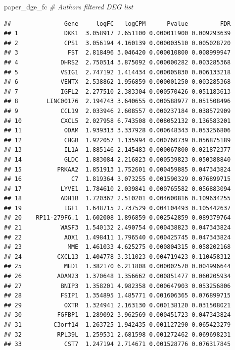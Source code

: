 \documentclass[
]{article}
\newenvironment{Shaded}{\begin{snugshade}}{\end{snugshade}}
\newcommand{\CommentTok}[1]{\textcolor[rgb]{0.56,0.35,0.01}{\textit{#1}}}
\newcommand{\NormalTok}[1]{#1}
\begin{document}
\begin{Shaded}
\begin{Highlighting}[]
\NormalTok{paper\_dge\_fc }\CommentTok{\# Authors\textquotesingle{} filtered DEG list}
\end{Highlighting}
\end{Shaded}

\begin{verbatim}
##               Gene     logFC   logCPM      Pvalue         FDR
## 1             DKK1  3.058917 2.651100 0.000011900 0.009293639
## 2             CPS1  3.056194 4.160139 0.000003510 0.005028720
## 3              FST  2.818496 3.046420 0.000010800 0.008999947
## 4            DHRS2  2.750514 3.875092 0.000000282 0.003285368
## 5            VSIG1  2.747192 1.414434 0.000005830 0.006133218
## 6            VENTX  2.538862 1.956859 0.000001250 0.003285368
## 7            IGFL2  2.277510 2.383304 0.000570426 0.051183613
## 8        LINC00176  2.194743 3.640655 0.000588977 0.051508496
## 9            CCL19  2.033946 2.608557 0.000237184 0.038572909
## 10           CXCL5  2.027958 6.743508 0.008052132 0.136583201
## 11            ODAM  1.939313 3.337928 0.000648343 0.053256806
## 12            CHGB  1.922057 1.135994 0.000760739 0.056875189
## 13            IL1A  1.885146 2.145483 0.000067800 0.021872377
## 14            GLDC  1.883084 2.216823 0.000539823 0.050388840
## 15          PRKAA2  1.851913 1.752601 0.000459885 0.047343824
## 16              C7  1.819364 3.073255 0.001590329 0.076899715
## 17           LYVE1  1.784610 2.039841 0.000765582 0.056883094
## 18           ADH1B  1.720362 2.510201 0.004600816 0.109634255
## 19            IGF1  1.648715 2.737529 0.004104493 0.105442637
## 20    RP11-279F6.1  1.602008 1.896859 0.002542859 0.089379764
## 21           WASF3  1.540132 2.490754 0.000438823 0.047343824
## 22            AOX1  1.498411 1.796540 0.000425745 0.047343824
## 23             MME  1.461033 4.625275 0.000804315 0.058202168
## 24          CXCL13  1.404778 3.311023 0.004719423 0.110458312
## 25            MED1  1.382170 6.211808 0.000002570 0.004996644
## 26          ADAM23  1.370648 1.356662 0.000851477 0.060205934
## 27           BNIP3  1.358201 4.982358 0.000647903 0.053256806
## 28           FSIP1  1.354895 1.485771 0.001606365 0.076899715
## 29            OXTR  1.324941 2.163130 0.000138120 0.031508021
## 30          FGFBP1  1.289092 3.962569 0.000451723 0.047343824
## 31         C3orf14  1.263725 1.942435 0.001127290 0.065423279
## 32          RPL39L  1.259531 2.681598 0.001272462 0.069698231
## 33            CST7  1.247194 2.714671 0.001528776 0.076317845

\end{verbatim}
\end{document}
